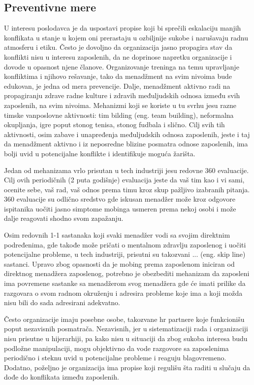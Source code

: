\documentclass[a4paper]{article}
\begin{document}
    \subsection{Preventivne mere}
    U interesu poslodavca je da uspostavi propise koji bi sprečili eskalaciju manjih konflikata u stanje u kojem oni prerastaju u ozbiljnije sukobe i narušavaju radnu atmosferu i etiku. Često je dovoljno da organizacija jasno propagira stav da konflikti nisu u interesu zaposlenih, da ne doprinose napretku organizacije i dovode u opasnost njene članove. Organizovanje treninga na temu upravljanje konfliktima i njihovo rešavanje, tako da menadžment na svim nivoima bude edukovan, je jedna od mera prevencije. Dalje, menadžment aktivno radi na propagiranju zdrave radne kulture i zdravih međuljudskih odnosa između svih zaposlenih, na svim nivoima. Mehanizmi koji se koriste u tu svrhu jesu razne timske vanposlovne aktivnosti: tim bilding (eng. team building), neformalna okupljanja, igre poput stonog tenisa, stonog fudbala i slično. Cilj svih tih aktivnosti, osim zabave i unapređenja međuljudskih odnosa zaposlenih, jeste i taj da menadžment aktivno i iz neposredne blizine posmatra odnose zaposlenih, ima bolji uvid u potencijalne konflikte i identifikuje moguća žarišta.

    Jedan od mehanizama vrlo prisutan u tech industriji jesu redovne 360 evaluacije.
    Cilj ovih periodičnih (2 puta godišnje) evaluacija jeste da vaš tim kao i vi sami, ocenite sebe, vaš rad, vaš odnos prema timu kroz skup pažljivo izabranih pitanja.
    360 evaluacije su odlično sredstvo gde iskusan menadžer može kroz odgovore ispitanika uočiti jasno simptome mobinga usmeren prema nekoj osobi i može dalje reagovati shodno svom zapažanju.

    Osim redovnih 1-1 sastanaka koji svaki menadžer vodi sa svojim direktnim podređenima, gde takođe može pričati o mentalnom zdravlju zaposlenog i uočiti potencijalne probleme, u tech industriji, prisutni su takozvani ... (eng. skip line) sastanci. Upravo zbog opasnosti da je mobing prema zaposlenom iniciran od direktnog menadžera zaposlenog, potrebno je obezbediti mehanizam da zaposleni ima povremene sastanke sa menadžerom svog menadžera gde će imati prilike da razgovara o svom radnom okruženju i adresira probleme koje ima a koji možda nisu bili do sada adresirani adekvatno.

    Često organizacije imaju posebne osobe, takozvane \acrshort{hr} partnere koje funkcionišu poput nezavisnih posmatrača. Nezavisnih, jer u sistematizaciji rada i organizaciji nisu prisutne u hijerarhiji, pa kako nisu u situaciji da zbog sukoba interesa budu podložne manipulaciji, mogu objektivno da vode razgovore sa zaposlenima periodično i steknu uvid u potencijalne probleme i reaguju blagovremeno. Dodatno, poželjno je organizacija ima propise koji regulišu šta raditi u slučaju da dođe do konflikata između zaposlenih.
\end{document}
